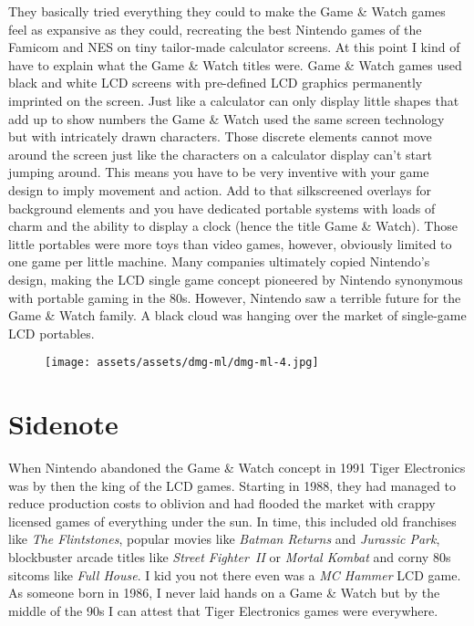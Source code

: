 \documentclass{book}
\begin{document}
They basically tried everything they could to make the Game \& Watch games feel as expansive as they could, recreating the best Nintendo games of the Famicom and NES on tiny tailor-made calculator screens. At this point I kind of have to explain what the Game \& Watch titles were. Game \& Watch games used black and white LCD screens with pre-defined LCD graphics permanently imprinted on the screen. Just like a calculator can only display little shapes that add up to show numbers the Game \& Watch used the same screen technology but with intricately drawn characters. Those discrete elements cannot move around the screen just like the characters on a calculator display can’t start jumping around. This means you have to be very inventive with your game design to imply movement and action. Add to that silkscreened overlays for background elements and you have dedicated portable systems with loads of charm and the ability to display a clock (hence the title Game \& Watch). Those little portables were more toys than video games, however, obviously limited to one game per little machine. Many companies ultimately copied Nintendo’s design, making the LCD single game concept pioneered by Nintendo synonymous with portable gaming in the 80s. However, Nintendo saw a terrible future for the Game \& Watch family. A black cloud was hanging over the market of single-game LCD portables.

\begin{figure}[hbt]
\vskip 10pt
\centering \texttt{[image: assets/assets/dmg-ml/dmg-ml-4.jpg]}
\vskip 6pt
\end{figure}

\FloatBarrier\needspace{10mm}\section*{Sidenote}\nopagebreak[4]

When Nintendo abandoned the Game \& Watch concept in 1991 Tiger Electronics was by then the king of the LCD games. Starting in 1988, they had managed to reduce production costs to oblivion and had flooded the market with crappy licensed games of everything under the sun. In time, this included old franchises like \emph{The Flintstones}, popular movies like \emph{Batman Returns} and \emph{Jurassic Park}, blockbuster arcade titles like \emph{Street Fighter~II} or \emph{Mortal Kombat} and corny 80s sitcoms like \emph{Full House}. I kid you not there even was a \emph{MC Hammer} LCD game. As someone born in 1986, I never laid hands on a Game \& Watch but by the middle of the 90s I can attest that Tiger Electronics games were everywhere.
\end{document}
